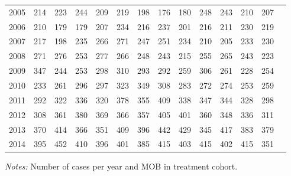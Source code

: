 \begin{table}[H]
\begin{threeparttable}
{\begin{tabular}{l*{13}{c}}
2005        &         214&         223&         244&         209&         219&         198&         176&         180&         248&         243&         210&         207\\
2006        &         210&         179&         179&         207&         234&         216&         237&         201&         216&         211&         230&         219\\
2007        &         217&         198&         235&         266&         271&         247&         251&         234&         210&         205&         233&         230\\
2008        &         271&         276&         253&         277&         266&         248&         243&         215&         255&         265&         243&         223\\
2009        &         347&         244&         253&         298&         310&         293&         292&         259&         306&         261&         228&         254\\
2010        &         233&         261&         296&         297&         323&         349&         308&         283&         272&         274&         253&         259\\
2011        &         292&         322&         336&         320&         378&         355&         409&         338&         347&         344&         328&         298\\
2012        &         308&         361&         380&         369&         366&         357&         405&         401&         360&         348&         336&         311\\
2013        &         370&         414&         366&         351&         409&         396&         442&         429&         345&         417&         383&         379\\
2014        &         395&         452&         410&         396&         401&         385&         415&         403&         415&         402&         415&         351\\
 \bottomrule \end{tabular} } \begin{tablenotes} \item \scriptsize \emph{Notes:} Number of cases per year and MOB in treatment cohort. \end{tablenotes} \end{threeparttable} \end{table} 
